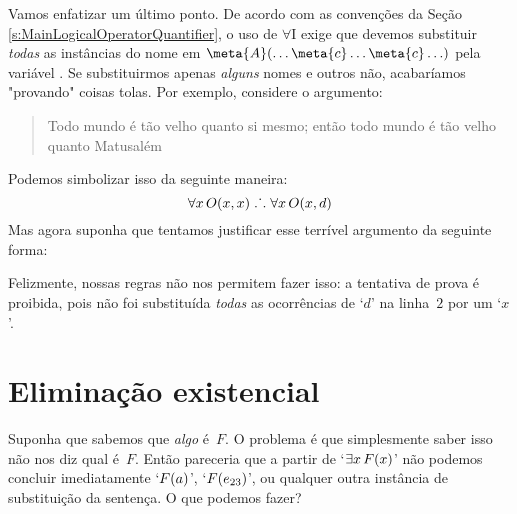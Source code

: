 Vamos enfatizar um \'ultimo ponto. De acordo com as conven\c c\~oes da Se\c c\~ao \ref{s:MainLogicalOperatorQuantifier}, o uso de $\forall$I exige que devemos substituir  \emph{todas} as inst\^ancias do nome  em $\meta{A}(\ldots \meta{c}\ldots\meta{c}\ldots)$ pela vari\'avel . Se substituirmos apenas \emph{alguns} nomes e outros n\~ao, acabar\'iamos "provando" coisas tolas. Por exemplo, considere o argumento:
	\begin{quote}
	Todo mundo \'e t\~ao velho quanto si mesmo; ent\~ao todo mundo \'e t\~ao velho quanto Matusal\'em
	\end{quote}
Podemos simbolizar isso da seguinte maneira:
$$\forall x\,\mathord{O}(x,x) \mathrel{\ldotp\dot{}\,\ldotp} \forall x\,\mathord{O}(x,d)$$
Mas agora suponha que tentamos justificar esse terr\'ivel argumento da seguinte forma:
\begin{fitchproof}
\end{fitchproof}
Felizmente, nossas regras n\~ao nos permitem fazer isso: a tentativa de prova \'e proibida, pois n\~ao  foi substitu\'ida   \emph{todas} as ocorr\^encias de `$d$' na linha~$2$ por um `$x$'.

\section{Elimina\c c\~ao  existencial}
Suponha que sabemos que \emph{algo} \'e~$F$. O problema \'e que simplesmente saber isso n\~ao nos diz qual \'e~$F$. Ent\~ao pareceria que a partir de `$\exists x\,\mathord{F}(x)$' n\~ao podemos concluir imediatamente `$\mathord{F}(a)$', `$\mathord{F}(e_{23})$', ou qualquer outra inst\^ancia de substitui\c c\~ao da senten\c ca. O que podemos fazer?
 
